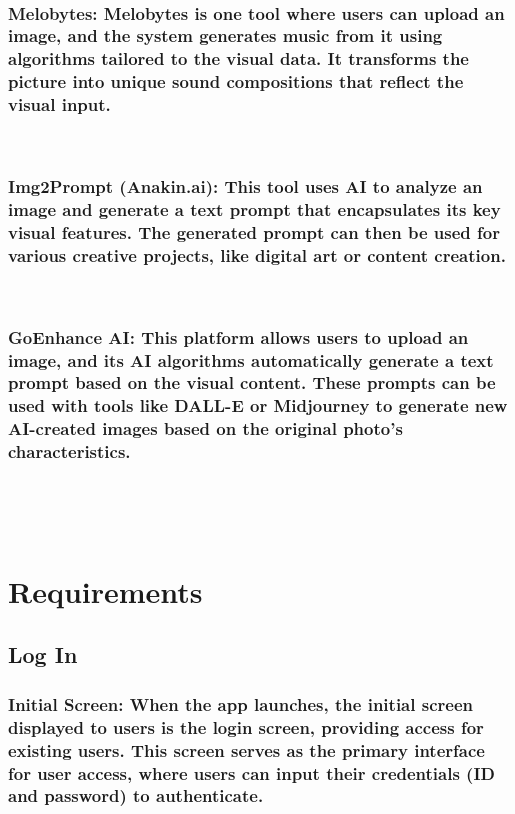 \documentclass[conference]{IEEEtran}
\begin{document}
\
\
\subsubsection{Melobytes: Melobytes is one tool where users can upload an image, and the system generates music from it using algorithms tailored to the visual data. It transforms the picture into unique sound compositions that reflect the visual input.}
\

\subsubsection{Img2Prompt (Anakin.ai): This tool uses AI to analyze an image and generate a text prompt that encapsulates its key visual features. The generated prompt can then be used for various creative projects, like digital art or content creation.}
\

\subsubsection{GoEnhance AI: This platform allows users to upload an image, and its AI algorithms automatically generate a text prompt based on the visual content. These prompts can be used with tools like DALL-E or Midjourney to generate new AI-created images based on the original photo's characteristics.}
\


\


\section{Requirements}

\subsection{Log In}

\subsubsection{Initial Screen: When the app launches, the initial screen displayed to users is the login screen, providing access for existing users. This screen serves as the primary interface for user access, where users can input their credentials (ID and password) to authenticate.}

\
\end{document}
